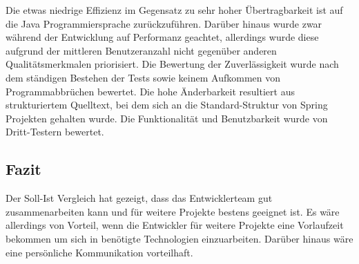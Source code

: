 Die etwas niedrige Effizienz im Gegensatz zu sehr hoher Übertragbarkeit ist auf die Java Programmiersprache zurückzuführen.
Darüber hinaus wurde zwar während der Entwicklung auf Performanz geachtet, allerdings wurde diese aufgrund
der mittleren Benutzeranzahl nicht gegenüber anderen Qualitätsmerkmalen priorisiert.
Die Bewertung der Zuverlässigkeit wurde nach dem ständigen Bestehen der Tests sowie keinem Aufkommen von Programmabbrüchen bewertet.
Die hohe Änderbarkeit resultiert aus strukturiertem Quelltext, bei dem sich an die Standard-Struktur von Spring Projekten gehalten wurde.
Die Funktionalität und Benutzbarkeit wurde von Dritt-Testern bewertet.

\subsection{Fazit}
Der Soll-Ist Vergleich hat gezeigt, dass das Entwicklerteam gut zusammenarbeiten kann und für weitere Projekte bestens geeignet ist.
Es wäre allerdings von Vorteil, wenn die Entwickler für weitere Projekte eine Vorlaufzeit bekommen um sich in benötigte
Technologien einzuarbeiten. Darüber hinaus wäre eine persönliche Kommunikation vorteilhaft.







